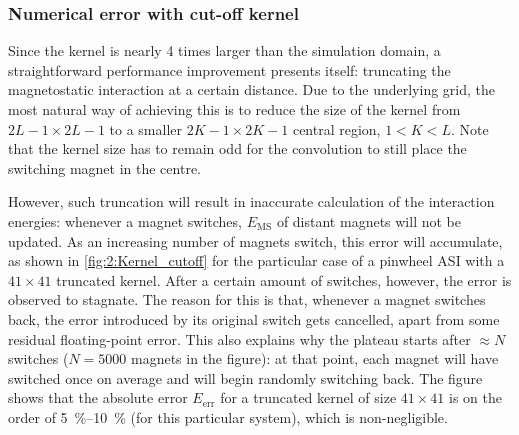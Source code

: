 \subsubsection{Numerical error with cut-off kernel}
Since the kernel is nearly 4 times larger than the simulation domain, a straightforward performance improvement presents itself: truncating the magnetostatic interaction at a certain distance.
Due to the underlying grid, the most natural way of achieving this is to reduce the size of the kernel from $2L-1 \times 2L-1$ to a smaller $2K-1 \times 2K-1$ central region, $1 < K < L$.
Note that the kernel size has to remain odd for the convolution to still place the switching magnet in the centre. \par
However, such truncation will result in inaccurate calculation of the interaction energies: whenever a magnet switches, $E_\mathrm{MS}$ of distant magnets will not be updated.
As an increasing number of magnets switch, this error will accumulate, as shown in \cref{fig:2:Kernel_cutoff} for the particular case of a pinwheel ASI with a $41 \times 41$ truncated kernel.
After a certain amount of switches, however, the error is observed to stagnate.
The reason for this is that, whenever a magnet switches back, the error introduced by its original switch gets cancelled, apart from some residual floating-point error.
This also explains why the plateau starts after $\approx N$ switches ($N=5000$ magnets in the figure): at that point, each magnet will have switched once on average and will begin randomly switching back.
The figure shows that the absolute error $E_\mathrm{err}$ for a truncated kernel of size $41 \times 41$ is on the order of \SIrange{5}{10}{\percent} (for this particular system), which is non-negligible.


